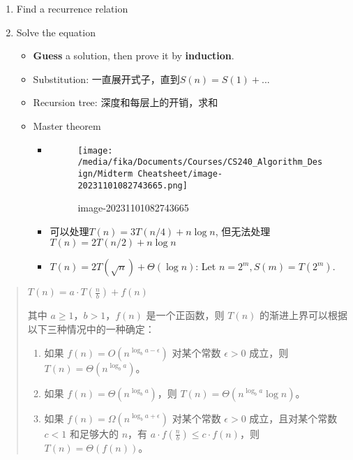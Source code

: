 \documentclass[]{article}
\begin{document}
\begin{enumerate}
\def\labelenumi{\arabic{enumi}.}
\item
  Find a recurrence relation
\item
  Solve the equation

  \begin{itemize}
  \item
    \textbf{Guess} a solution, then prove it by \textbf{induction}.
  \item
    Substitution: 一直展开式子，直到\(S(n) = S(1)+...\)
  \item
    Recursion tree: 深度和每层上的开销，求和
  \item
    Master theorem

    \begin{itemize}
    \item
      \begin{figure}
      \centering
      \texttt{[image: /media/fika/Documents/Courses/CS240\_Algorithm\_Design/Midterm Cheatsheet/image-20231101082743665.png]}
      \caption{image-20231101082743665}
      \end{figure}
    \item
      可以处理\(T(n) = 3T(n/4)+n\log n\),
      但无法处理\(T(n) = 2T(n/2)+n\log n\)
    \item
      \(T(n)=2T(\sqrt{n})+\Theta(\log n)\): Let
      \(n = 2^m, S(m)=T(2^m)\).
    \end{itemize}
  \end{itemize}
\end{enumerate}

\begin{quote}
\(T(n) = a \cdot T\left(\frac{n}{b}\right) + f(n)\)

其中 \(a \geq 1\)，\(b > 1\)，\(f(n)\) 是一个正函数，则 \(T(n)\)
的渐进上界可以根据以下三种情况中的一种确定：

\begin{enumerate}
\def\labelenumi{\arabic{enumi}.}
\item
  如果 \(f(n) = O(n^{\log_b a - \epsilon})\) 对某个常数 \(\epsilon > 0\)
  成立，则 \(T(n) = \Theta(n^{\log_b a})\)。
\item
  如果 \(f(n) = \Theta(n^{\log_b a})\)，则
  \(T(n) = \Theta(n^{\log_b a} \log n)\)。
\item
  如果 \(f(n) = \Omega(n^{\log_b a + \epsilon})\) 对某个常数
  \(\epsilon > 0\) 成立，且对某个常数 \(c < 1\) 和足够大的 \(n\)，有
  \(a \cdot f\left(\frac{n}{b}\right) \leq c \cdot f(n)\)，则
  \(T(n) = \Theta(f(n))\)。
\end{enumerate}
\end{quote}
\end{document}
